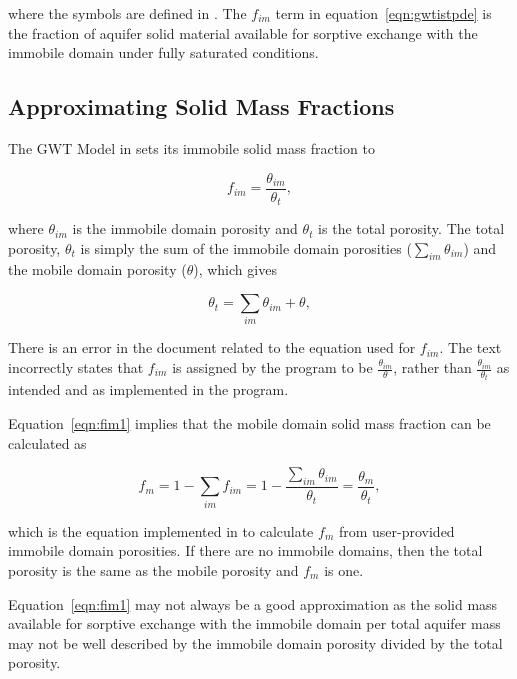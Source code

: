 \noindent where the symbols are defined in \cite{modflow6gwt}.  The $f_{im}$ term in equation~\ref{eqn:gwtistpde} is the fraction of aquifer solid material available for sorptive exchange with the immobile domain under fully saturated conditions.  

\subsection{Approximating Solid Mass Fractions} \label{sec:solidmassfrac1}

The GWT Model in \mf sets its immobile solid mass fraction to

\begin{equation}
\label{eqn:fim1}
f_{im} = \frac{\theta_{im}}{\theta_t},
\end{equation}

\noindent where $\theta_{im}$ is the immobile domain porosity and $\theta_t$ is the total porosity.  The total porosity, $\theta_t$ is simply the sum of the immobile domain porosities ($\sum_{im}{\theta_{im}}$) and the mobile domain porosity ($\theta$), which gives

\begin{equation}
\label{eqn:thetat1}
\theta_t = \sum_{im}{\theta_{im}} + \theta,
\end{equation}

\noindent There is an error in the \cite{modflow6gwt} document related to the equation used for $f_{im}$.  The text incorrectly states that $f_{im}$ is assigned by the program to be $\frac{\theta_{im}}{\theta}$, rather than $\frac{\theta_{im}}{\theta_t}$ as intended and as implemented in the \mf program.

Equation~\ref{eqn:fim1} implies that the mobile domain solid mass fraction can be calculated as

\begin{equation}
\label{eqn:fm1}
f_m = 1 - \sum_{im}f_{im} = 1 - \frac{\sum_{im}\theta_{im}}{\theta_t} = \frac{\theta_{m}}{\theta_t},
\end{equation}

\noindent which is the equation implemented in \mf to calculate $f_m$ from user-provided immobile domain porosities.  If there are no immobile domains, then the total porosity is the same as the mobile porosity and $f_m$ is one.

Equation~\ref{eqn:fim1} may not always be a good approximation as the solid mass available for sorptive exchange with the immobile domain per total aquifer mass may not be well described by the immobile domain porosity divided by the total porosity.


